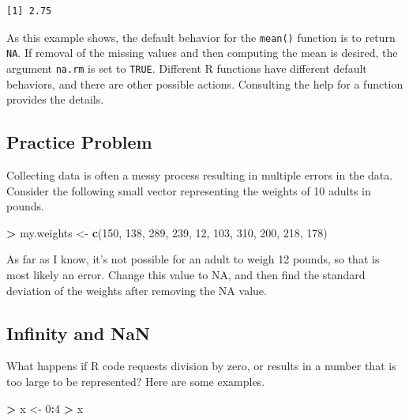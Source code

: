 \documentclass[
]{krantz}
\makeatletter
\newenvironment{Shaded}{\begin{snugshade}}{\end{snugshade}}
\newcommand{\DecValTok}[1]{\textcolor[rgb]{0.06,0.06,0.06}{#1}}
\newcommand{\KeywordTok}[1]{\textcolor[rgb]{0.27,0.27,0.27}{\textbf{#1}}}
\newcommand{\NormalTok}[1]{#1}
\newcommand{\OperatorTok}[1]{\textcolor[rgb]{0.43,0.43,0.43}{\textbf{#1}}}
\newcommand{\StringTok}[1]{\textcolor[rgb]{0.5,0.5,0.5}{#1}}
\newenvironment{kframe}{%
\medskip{}
\setlength{\fboxsep}{.8em}
 \def\at@end@of@kframe{}%
 \ifinner\ifhmode%
  \def\at@end@of@kframe{\end{minipage}}%
  \begin{minipage}{\columnwidth}%
 \fi\fi%
 \def\FrameCommand##1{\hskip\@totalleftmargin \hskip-\fboxsep
 \colorbox{shadecolor}{##1}\hskip-\fboxsep
     \hskip-\linewidth \hskip-\@totalleftmargin \hskip\columnwidth}%
 \MakeFramed {\advance\hsize-\width
   \@totalleftmargin\z@ \linewidth\hsize
   \@setminipage}}%
 {\par\unskip\endMakeFramed%
 \at@end@of@kframe}
\renewenvironment{Shaded}{\begin{kframe}}{\end{kframe}}
\makeatother
\begin{document}
\begin{verbatim}
[1] 2.75
\end{verbatim}

As this example shows, the default behavior for the \texttt{mean()} function is to return \texttt{NA}. If removal of the missing values and then computing the mean is desired, the argument \texttt{na.rm} is set to \texttt{TRUE}. Different R functions have different default behaviors, and there are other possible actions. Consulting the help for a function provides the details.

\hypertarget{practice-problem-2}{%
\subsection{Practice Problem}\label{practice-problem-2}}

Collecting data is often a messy process resulting in multiple errors in the data. Consider the following small vector representing the weights of 10 adults in pounds.

\begin{Shaded}
\begin{Highlighting}[]
\OperatorTok{\textgreater{}}\StringTok{ }\NormalTok{my.weights \textless{}{-}}\StringTok{ }\KeywordTok{c}\NormalTok{(}\DecValTok{150}\NormalTok{, }\DecValTok{138}\NormalTok{, }\DecValTok{289}\NormalTok{, }\DecValTok{239}\NormalTok{, }\DecValTok{12}\NormalTok{, }\DecValTok{103}\NormalTok{, }\DecValTok{310}\NormalTok{, }\DecValTok{200}\NormalTok{, }\DecValTok{218}\NormalTok{, }\DecValTok{178}\NormalTok{)}
\end{Highlighting}
\end{Shaded}

As far as I know, it's not possible for an adult to weigh 12 pounds, so that is most likely an error. Change this value to NA, and then find the standard deviation of the weights after removing the NA value.

\hypertarget{infinity-and-nan}{%
\subsection{Infinity and NaN}\label{infinity-and-nan}}

What happens if R code requests division by zero, or results in a number that is too large to be represented? Here are some examples.

\begin{Shaded}
\begin{Highlighting}[]
\OperatorTok{\textgreater{}}\StringTok{ }\NormalTok{x \textless{}{-}}\StringTok{ }\DecValTok{0}\OperatorTok{:}\DecValTok{4}
\OperatorTok{\textgreater{}}\StringTok{ }\NormalTok{x}
\end{Highlighting}
\end{Shaded}
\end{document}

